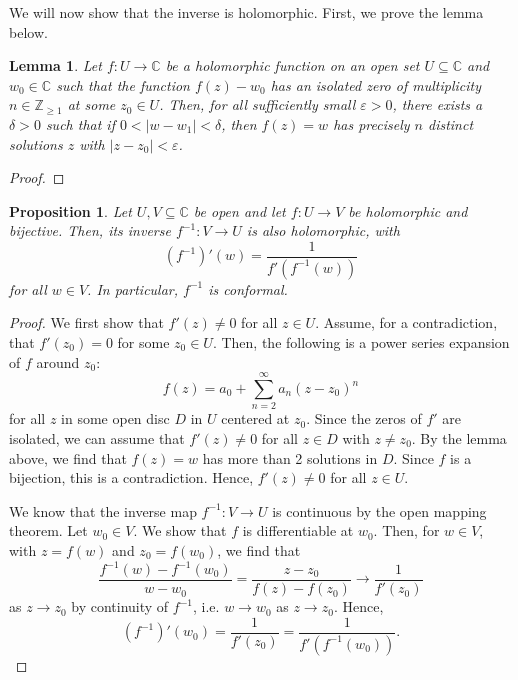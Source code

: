 \documentclass[a4paper, openany]{memoir}
\theoremstyle{definition}
\theoremstyle{plain}
\newtheorem{lemma}[definition]{Lemma}
\newtheorem{proposition}[definition]{Proposition}
\begin{document}
    We will now show that the inverse is holomorphic. First, we prove the lemma below.
    \begin{lemma}
        Let $f \colon U \to \mathbb{C}$ be a holomorphic function on an open set $U \subseteq \mathbb{C}$ and $w_0 \in \mathbb{C}$ such that the function $f(z) - w_0$ has an isolated zero of multiplicity $n \in \mathbb{Z}_{\geq 1}$ at some $z_0 \in U$. Then, for all sufficiently small $\varepsilon > 0$, there exists a $\delta > 0$ such that if $0 < |w - w_1| < \delta$, then $f(z) = w$ has precisely $n$ distinct solutions $z$ with $|z - z_0| < \varepsilon$.
    \end{lemma}
    \begin{proof}
    \end{proof}

    \begin{proposition}
        Let $U, V \subseteq \mathbb{C}$ be open and let $f \colon U \to V$ be holomorphic and bijective. Then, its inverse $f^{-1} \colon V \to U$ is also holomorphic, with
        \[(f^{-1})'(w) = \frac{1}{f'(f^{-1}(w))}\]
        for all $w \in V$. In particular, $f^{-1}$ is conformal.
    \end{proposition}
    \begin{proof}
        We first show that $f'(z) \neq 0$ for all $z \in U$. Assume, for a contradiction, that $f'(z_0) = 0$ for some $z_0 \in U$. Then, the following is a power series expansion of $f$ around $z_0$:
        \[f(z) = a_0 + \sum_{n=2}^\infty a_n (z - z_0)^n\]
        for all $z$ in some open disc $D$ in $U$ centered at $z_0$. Since the zeros of $f'$ are isolated, we can assume that $f'(z) \neq 0$ for all $z \in D$ with $z \neq z_0$. By the lemma above, we find that $f(z) = w$ has more than 2 solutions in $D$. Since $f$ is a bijection, this is a contradiction. Hence, $f'(z) \neq 0$ for all $z \in U$.

        We know that the inverse map $f^{-1} \colon V \to U$ is continuous by the open mapping theorem. Let $w_0 \in V$. We show that $f$ is differentiable at $w_0$. Then, for $w \in V$, with $z = f(w)$ and $z_0 = f(w_0)$, we find that
        \[\frac{f^{-1}(w) - f^{-1}(w_0)}{w - w_0} = \frac{z - z_0}{f(z) - f(z_0)} \to \frac{1}{f'(z_0)}\]
        as $z \to z_0$ by continuity of $f^{-1}$, i.e. $w \to w_0$ as $z \to z_0$. Hence,
        \[(f^{-1})'(w_0) = \frac{1}{f'(z_0)} = \frac{1}{f'(f^{-1}(w_0))}.\]
    \end{proof}
\end{document}
